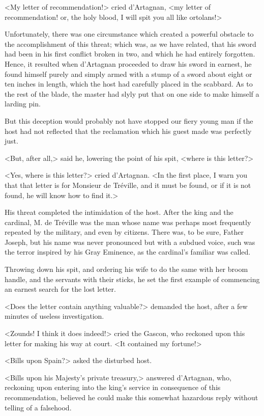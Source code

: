 <My letter of recommendation!> cried d'Artagnan, <my letter of recommendation! or, the holy blood, I will spit you all like ortolans!> 

Unfortunately, there was one circumstance which created a powerful obstacle to the accomplishment of this threat; which was, as we have related, that his sword had been in his first conflict broken in two, and which he had entirely forgotten. Hence, it resulted when d'Artagnan proceeded to draw his sword in earnest, he found himself purely and simply armed with a stump of a sword about eight or ten inches in length, which the host had carefully placed in the scabbard. As to the rest of the blade, the master had slyly put that on one side to make himself a larding pin. 

But this deception would probably not have stopped our fiery young man if the host had not reflected that the reclamation which his guest made was perfectly just. 

<But, after all,> said he, lowering the point of his spit, <where is this letter?> 

<Yes, where is this letter?> cried d'Artagnan. <In the first place, I warn you that that letter is for Monsieur de Tréville, and it must be found, or if it is not found, he will know how to find it.> 

His threat completed the intimidation of the host. After the king and the cardinal, M. de Tréville was the man whose name was perhaps most frequently repeated by the military, and even by citizens. There was, to be sure, Father Joseph, but his name was never pronounced but with a subdued voice, such was the terror inspired by his Gray Eminence, as the cardinal's familiar was called. 

Throwing down his spit, and ordering his wife to do the same with her broom handle, and the servants with their sticks, he set the first example of commencing an earnest search for the lost letter. 

<Does the letter contain anything valuable?> demanded the host, after a few minutes of useless investigation. 

<Zounds! I think it does indeed!> cried the Gascon, who reckoned upon this letter for making his way at court. <It contained my fortune!> 

<Bills upon Spain?> asked the disturbed host. 

<Bills upon his Majesty's private treasury,> answered d'Artagnan, who, reckoning upon entering into the king's service in consequence of this recommendation, believed he could make this somewhat hazardous reply without telling of a falsehood. 

